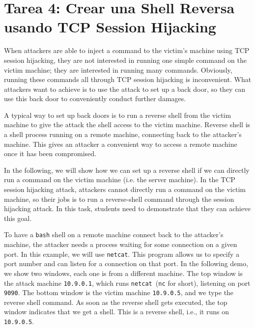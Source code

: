 \section{Tarea 4: Crear una Shell Reversa usando TCP Session Hijacking}

When attackers are able to inject a command to the victim's machine using
TCP session hijacking, they are not interested in running one simple
command on the victim machine; they are interested in running many
commands. Obviously, running these commands all through TCP session
hijacking is inconvenient. What attackers want to achieve is to use the
attack to set up a back door, so they can use this
back door to conveniently conduct further damages.

A typical way to set up back doors is to run a reverse shell from the
victim machine to give the attack the shell access to the victim machine.
Reverse shell is a shell process running on a remote machine, connecting
back to the attacker's machine. This gives an attacker a convenient way to
access a remote machine once it has been compromised. 


In the following, we will show how we can set up a reverse shell if we can
directly run a command on the victim machine (i.e. the server machine). 
In the TCP session hijacking attack, attackers cannot directly run a
command on the victim machine, so their jobs is to run a reverse-shell
command through the session hijacking attack. 
In this task, students need to demonstrate that they can achieve this goal.


To have a \texttt{bash} shell on a remote machine connect back to the attacker's machine, the
attacker needs a process waiting for some connection on a given port. In this example, we will
use \texttt{netcat}. This program allows us to specify a port
number and can listen for a connection on that port.
In the following demo, we show two windows, each one is from a 
different machine. The top window is the attack machine \texttt{10.9.0.1},  
which runs \texttt{netcat}~(\texttt{nc} for short), listening on port \texttt{9090}. 
The bottom window is the victim machine \texttt{10.9.0.5}, and 
we type the reverse shell command.
As soon as the reverse shell gets executed, the top window indicates 
that we get a shell. This is a reverse shell, i.e., it runs on \texttt{10.9.0.5}.  

